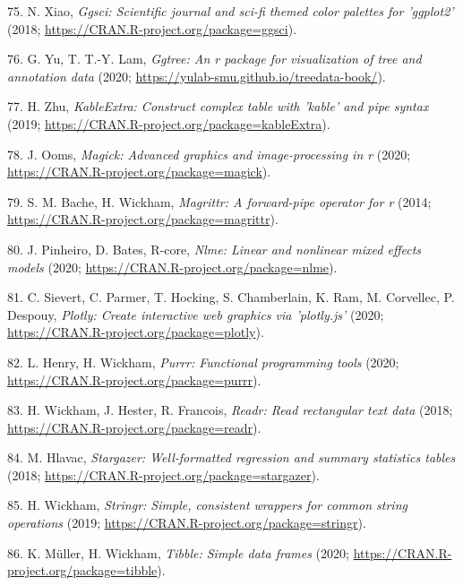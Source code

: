 \documentclass[]{elsarticle} %
\begin{document}
\leavevmode\hypertarget{ref-R-ggsci}{}%
75. N. Xiao, \emph{Ggsci: Scientific journal and sci-fi themed color palettes for 'ggplot2'} (2018; \url{https://CRAN.R-project.org/package=ggsci}).

\leavevmode\hypertarget{ref-R-ggtree}{}%
76. G. Yu, T. T.-Y. Lam, \emph{Ggtree: An r package for visualization of tree and annotation data} (2020; \url{https://yulab-smu.github.io/treedata-book/}).

\leavevmode\hypertarget{ref-R-kableExtra}{}%
77. H. Zhu, \emph{KableExtra: Construct complex table with 'kable' and pipe syntax} (2019; \url{https://CRAN.R-project.org/package=kableExtra}).

\leavevmode\hypertarget{ref-R-magick}{}%
78. J. Ooms, \emph{Magick: Advanced graphics and image-processing in r} (2020; \url{https://CRAN.R-project.org/package=magick}).

\leavevmode\hypertarget{ref-R-magrittr}{}%
79. S. M. Bache, H. Wickham, \emph{Magrittr: A forward-pipe operator for r} (2014; \url{https://CRAN.R-project.org/package=magrittr}).

\leavevmode\hypertarget{ref-R-nlme}{}%
80. J. Pinheiro, D. Bates, R-core, \emph{Nlme: Linear and nonlinear mixed effects models} (2020; \url{https://CRAN.R-project.org/package=nlme}).

\leavevmode\hypertarget{ref-R-plotly}{}%
81. C. Sievert, C. Parmer, T. Hocking, S. Chamberlain, K. Ram, M. Corvellec, P. Despouy, \emph{Plotly: Create interactive web graphics via 'plotly.js'} (2020; \url{https://CRAN.R-project.org/package=plotly}).

\leavevmode\hypertarget{ref-R-purrr}{}%
82. L. Henry, H. Wickham, \emph{Purrr: Functional programming tools} (2020; \url{https://CRAN.R-project.org/package=purrr}).

\leavevmode\hypertarget{ref-R-readr}{}%
83. H. Wickham, J. Hester, R. Francois, \emph{Readr: Read rectangular text data} (2018; \url{https://CRAN.R-project.org/package=readr}).

\leavevmode\hypertarget{ref-R-stargazer}{}%
84. M. Hlavac, \emph{Stargazer: Well-formatted regression and summary statistics tables} (2018; \url{https://CRAN.R-project.org/package=stargazer}).

\leavevmode\hypertarget{ref-R-stringr}{}%
85. H. Wickham, \emph{Stringr: Simple, consistent wrappers for common string operations} (2019; \url{https://CRAN.R-project.org/package=stringr}).

\leavevmode\hypertarget{ref-R-tibble}{}%
86. K. Müller, H. Wickham, \emph{Tibble: Simple data frames} (2020; \url{https://CRAN.R-project.org/package=tibble}).
\end{document}
